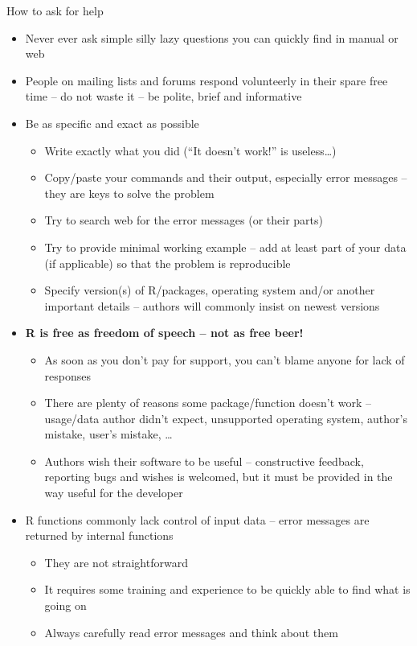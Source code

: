 \documentclass[compress, ucs, xelatex, 11pt, xcolor=svgnames,
  hyperref={
    bookmarks=true,
    unicode=true,
    colorlinks=true,
    pdftitle={Molecular data in R},
    plainpages=false,
    pdfauthor={Vojtech Zeisek},
    pdfsubject={Course about phylogeny and evolution in R},
    pdfcreator={XeLaTeX},
    pdfkeywords={R, evolution, phylogeny, molecular data},
    linkcolor=Tomato,
    anchorcolor=SaddleBrown,
    citecolor=Goldenrod,
    filecolor=DarkMagenta,
    menucolor=Sienna,
    urlcolor=DarkTurquoise,
    pdftex},
  url={hyphens, lowtilde} %
  ]{beamer}
\begin{document}
\begin{frame}[allowframebreaks]{How to ask for help}
  \begin{itemize}
    \item \alert{Never ever} ask simple silly lazy questions you can quickly find in manual or web
    \item People on mailing lists and forums respond volunteerly in their spare free time -- do not waste it -- be polite, brief and informative
    \item Be as specific and exact as possible
    \begin{itemize}
      \item Write \alert{exactly} what you did (``It doesn't work!'' is useless\ldots)
      \item Copy/paste your commands and their output, especially error messages -- they are keys to solve the problem
      \item Try to search web for the error messages (or their parts)
      \item Try to provide minimal working example -- add at least part of your data (if applicable) so that the problem is reproducible
      \item Specify version(s) of R/packages, operating system and/or another important details -- authors will commonly insist on newest versions
    \end{itemize}
    \item \textbf{R is free as freedom of speech -- not as free beer!}
    \begin{itemize}
      \item As soon as you don't pay for support, you can't blame anyone for lack of responses
      \item There are plenty of reasons some package/function doesn't work -- usage/data author didn't expect, unsupported operating system, author's mistake, user's mistake, \ldots
      \item Authors wish their software to be useful -- constructive feedback, reporting bugs and wishes is welcomed, but it must be provided in the way useful for the developer
    \end{itemize}
    \item R functions commonly lack control of input data -- error messages are returned by internal functions
    \begin{itemize}
      \item They are not straightforward
      \item It requires some training and experience to be quickly able to find what is going on
      \item Always carefully read error messages and think about them
    \end{itemize}
  \end{itemize}
\end{frame}
\end{document}
